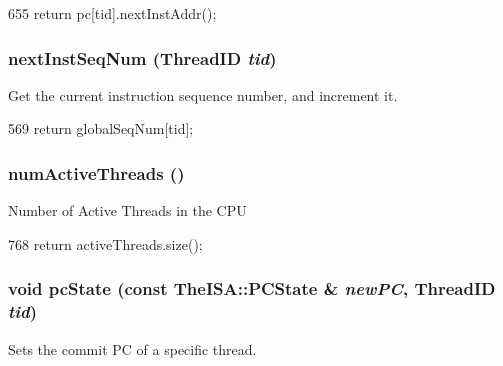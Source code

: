 \begin{DoxyCode}
655 { return pc[tid].nextInstAddr(); }
\end{DoxyCode}
\hypertarget{classInOrderCPU_a5e508adfef98ea6ed53f25edcd5c9397}{
\subsubsection[{nextInstSeqNum}]{ nextInstSeqNum ({\bf ThreadID} {\em tid})}}
\label{classInOrderCPU_a5e508adfef98ea6ed53f25edcd5c9397}
Get the current instruction sequence number, and increment it. 


\begin{DoxyCode}
569     { return globalSeqNum[tid]; }
\end{DoxyCode}
\hypertarget{classInOrderCPU_a8e60aca1dc5b29bde283a916f34bc944}{
\subsubsection[{numActiveThreads}]{ numActiveThreads ()}}
\label{classInOrderCPU_a8e60aca1dc5b29bde283a916f34bc944}
Number of Active Threads in the CPU 


\begin{DoxyCode}
768 { return activeThreads.size(); }
\end{DoxyCode}
\hypertarget{classInOrderCPU_a992a623bd3e0d79c4a361ee71c9d642d}{
\subsubsection[{pcState}]{\setlength{\rightskip}{0pt plus 5cm}void pcState (const TheISA::PCState \& {\em newPC}, \/  {\bf ThreadID} {\em tid})}}
\label{classInOrderCPU_a992a623bd3e0d79c4a361ee71c9d642d}
Sets the commit PC of a specific thread. 


